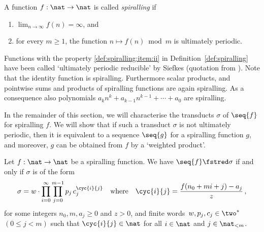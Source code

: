 \begin{definition}\label{def:spiralling}
  A function $f : \nat \to \nat$ 
  is called \emph{spiralling}
  if 
  \begin{enumerate}
    \item{}\label{def:spiralling:item:i}
      $\lim_{n \to \infty} f(n) = \infty$, and
    \item{}\label{def:spiralling:item:ii} 
      for every $m \ge 1$, the function $n \mapsto f(n) \bmod m$ is ultimately periodic.
  \end{enumerate}
\end{definition}

Functions with the property \ref{def:spiralling:item:ii} in Definition~\ref{def:spiralling}
have been called `ultimately periodic reducible' by Siefkes \cite{sief:1971} (quotation from \cite{seif:mcna:1976}). 
Note that the identity function is spiralling.
Furthermore scalar products, and pointwise sums and products of spiralling functions 
are again spiralling. 
As a consequence also polynomials $a_k n^k + a_{k-1} n^{k-1} + \cdots + a_0$ are spiralling.

In the remainder of this section, we will characterise the transducts $\sigma$ of $\seq{f}$ for spiralling $f$.
We will show that if such a transduct $\sigma$ is not ultimately periodic, 
then it is equivalent to a sequence $\seq{g}$ for a spiralling function $g$, 
and moreover, $g$ can be obtained from $f$ by a `weighted product'.

\begin{lemma}\label{lem:transducts}
  Let $f : \nat \to \nat$ be a spiralling function.
  We have $\seq{f} \fstred \sigma$
  if and only if 
  $\sigma$ is of the form
  \begin{align}
    \sigma = w \cdot \prod_{i = 0}^{\infty} \prod_{j = 0}^{m-1} p_j \, c_j^{\cyc{i}{j}}
    && \text{where} &&
    \cyc{i}{j} = \frac{f(n_0 + m i + j) - a_j}{z} \,,
    \label{eq:double:prod}
  \end{align}
  for some integers $n_0,m,a_j \ge 0$ and $z > 0$, 
  and finite words~$w, p_j, c_j \in \two^*$ $(0 \le j \lt m)$
  such that $\cyc{i}{j} \in \nat$ for all $i \in \nat$ and $j \in \nat_{<m}$.
\end{lemma}

